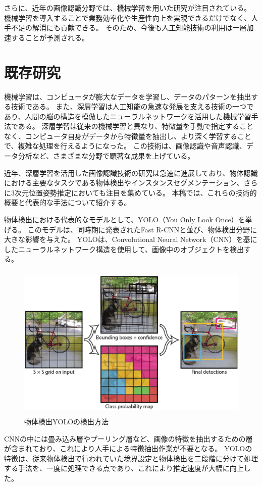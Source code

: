 さらに、近年の画像認識分野では、機械学習を用いた研究が注目されている。
機械学習を導入することで業務効率化や生産性向上を実現できるだけでなく、人手不足の解消にも貢献できる。
そのため、今後も人工知能技術の利用は一層加速することが予測される。



\section{既存研究}
機械学習は、コンピュータが膨大なデータを学習し、データのパターンを抽出する技術である。
また、深層学習は人工知能の急速な発展を支える技術の一つであり、人間の脳の構造を模倣したニューラルネットワークを活用した機械学習手法である。
深層学習は従来の機械学習と異なり、特徴量を手動で指定することなく、コンピュータ自身がデータから特徴量を抽出し、より深く学習することで、複雑な処理を行えるようになった。
この技術は、画像認識や音声認識、データ分析など、さまざまな分野で顕著な成果を上げている。

近年、深層学習を活用した画像認識技術の研究は急速に進展しており、物体認識における主要なタスクである物体検出やインスタンスセグメンテーション、さらに3次元位置姿勢推定においても注目を集めている。
本稿では、これらの技術的概要と代表的な手法について紹介する。

物体検出における代表的なモデルとして、YOLO（You Only Look Once）を挙げる。
このモデルは、同時期に発表されたFast R-CNNと並び、物体検出分野に大きな影響を与えた。
YOLOは、Convolutional Neural Network（CNN）を基にしたニューラルネットワーク構造を使用して、画像中のオブジェクトを検出する。
\begin{figure}[htbt]
	\centering
	 \includegraphics[height=75mm]{Figure/YOLO.eps}
	 \caption{物体検出YOLOの検出方法}
	 \label{fig:f4}
\end{figure}

CNNの中には畳み込み層やプーリング層など、画像の特徴を抽出するための層が含まれており、これにより人手による特徴抽出作業が不要となる。
YOLOの特徴は、従来物体検出で行われていた境界設定と物体検出を二段階に分けて処理する手法を、一度に処理できる点であり、これにより推定速度が大幅に向上した。

